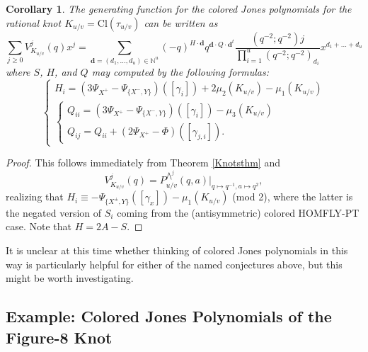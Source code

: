 \documentclass[11pt]{amsart}
\theoremstyle{plain}
\newtheorem{corollaryN}[theoremN]{Corollary}
\theoremstyle{definition}
\theoremstyle{remark}
\begin{document}
\begin{corollaryN}
\label{coloredJones}
 The generating function for the colored Jones polynomials for the rational knot $K_{u/v}=\text{Cl}(\tau_{u/v})$ can be written as
    \begin{equation}
        \sum_{j\geq 0} V_{K_{u/v}}^j(q)x^j=\sum_{\textbf{d}=(d_1,...,d_u)\in \mathbb{N}^u}(-q)^{H\cdot \textbf{d}}q^{\textbf{d} \cdot Q\cdot \textbf{d}^t} \frac{(q^{-2};q^{-2})j}{\prod_{i=1}^u (q^{-2};q^{-2})_{d_i}}x^{d_1+...+d_u}
    \end{equation}
    where $S$, $H$, and $Q$ may computed by the following formulas:
    \[
    \begin{cases}
        H_i=(3\Psi_{X^+}-\Psi_{\{X^-,Y\}})([\gamma_i])+2\mu_2(K_{u/v})-\mu_1(K_{u/v})\\
        \begin{cases}
            Q_{ii}=(3\Psi_{X^+}-\Psi_{\{X^-,Y\}})([\gamma_i])-\mu_3(K_{u/v})\\
            Q_{ij}=Q_{ii}+(2\Psi_{X^+}-\Phi)([\gamma_{j,i}]).
        \end{cases}
    \end{cases}
    \]   
\end{corollaryN}

\begin{proof}
    This follows immediately from Theorem \ref{Knotsthm} and
    \[
    V_{K_{u/v}}^j(q)=P^{\bigwedge^j}_{u/v}(q,a)\bigg|_{q\mapsto q^{-1},a\mapsto q^2},
    \] 
    realizing that $H_i\equiv -\Psi_{\{X^\pm,Y\}}([\gamma_x])-\mu_1(K_{u/v})$ (mod 2), where the latter is the negated version of $S_i$ coming from the (antisymmetric) colored HOMFLY-PT case. Note that $H=2A-S$.
\end{proof}

It is unclear at this time whether thinking of colored Jones polynomials in this way is particularly helpful for either of the named conjectures above, but this might be worth investigating.

\subsection{Example: Colored Jones Polynomials of the Figure-8 Knot}
\end{document}
